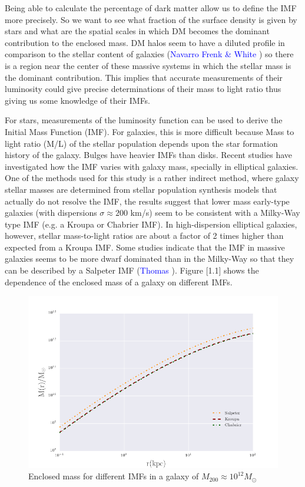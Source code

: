 Being able to calculate the percentage of dark matter allow us to define the IMF more precisely. So we want to see what fraction of the surface density is given by stars and what are the spatial scales in which DM becomes the dominant contribution to the enclosed mass. DM halos seem to have a diluted profile in comparison to the stellar content of galaxies (\textcolor{blue}{Navarro Frenk \& White} \citeyear{Reference17}) so there is a region near the center of these massive systems in which the stellar mass is the dominant contribution. This implies that accurate measurements of their luminosity could give precise determinations of their mass to light ratio thus giving us some knowledge of their IMFs.

For stars, measurements of the luminosity function can be used to derive the Initial Mass Function (IMF). For galaxies, this is more difficult because Mass to light ratio (M/L) of the stellar population depends upon the star formation history of the galaxy. Bulges have heavier IMFs than disks. Recent studies have investigated how the IMF varies with galaxy mass, specially in elliptical galaxies. One of the methods used for this study is a rather indirect method, where galaxy stellar masses are determined from stellar population synthesis models that actually do not resolve the IMF, the results suggest that lower mass early-type galaxies (with dispersions $\sigma \approx 200$ km/s) seem to be consistent with a Milky-Way type IMF (e.g. a Kroupa or Chabrier IMF). In high-dispersion elliptical galaxies, however, stellar mass-to-light ratios are about a factor of 2 times higher than expected from a Kroupa IMF. Some studies indicate that the IMF in massive galaxies seems to be more dwarf dominated than in the Milky-Way so that they can be described by a Salpeter IMF (\textcolor{blue}{Thomas} \citeyear{Reference28}). Figure [1.1] shows the dependence of the enclosed mass of a galaxy on different IMFs.

\begin{figure}[H]
\centering
\includegraphics[width=12cm]{images/Enclosed_Mass_IMFs.png}
\caption[Enclosed mass for different IMFs in a galaxy]{Enclosed mass for different IMFs in a galaxy of $M_{200}\approx 10^{12} M_{\odot}$}
\end{figure}   

